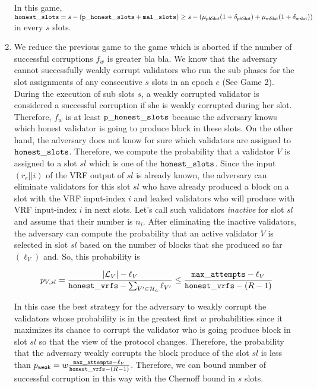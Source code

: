 \begin{enumerate}[label={{Game }}{{\arabic*}}]
	 In this game, $ \mathtt{honest\_slots} = s - (\mathtt{p\_honest\_slots} + \mathtt{mal\_slots}) \geq s - (\mu_{\mathsf{phSlot}}(1+\delta_{\mathsf{phSlot}})+ \mu_{\mathsf{mSlot}}(1+\delta_{\mathsf{mslot}})) $ in every $ s $ slots.
	 \item We reduce the previous game to the game which is aborted if the number of successful corruptions $ f_w $ is greater bla bla. We know that the adversary cannot successfully weakly corrupt validators who run the sub phases for the slot assignments of any consecutive $ s $ slots in an epoch $ e $ (See Game 2). During the execution of sub slots $ s $, a weakly corrupted validator is considered a successful corruption if she is weakly corrupted during her slot. Therefore, $ f_w $ is at least $ \mathtt{p\_honest\_slots} $ because the adversary knows which honest validator is going to produce block in these slots. On the other hand, the adversary does not know for sure which validators are assigned to $ \mathtt{honest\_slots} $. Therefore, we compute the probability that a validator $ V $ is assigned to a slot $ sl $ which is one of the $ \mathtt{honest\_slots} $.
	 Since the input $ (r_e||i) $ of the VRF output of $ sl $ is already known, the adversary can eliminate validators for this slot $ sl $ who have already produced a block on a slot with the VRF input-index $ i $ and leaked validators who will produce with VRF input-index $ i $ in next slots. Let's call such validators \emph{inactive} for slot $ sl $ and assume that their number is $ n_i $. After eliminating the inactive validators, the adversary can compute the probability that an active validator $ V $ is selected in slot $ sl $ based on the number of blocks that she produced so far $ (\ell_V) $ and. So, this probability is
	 
	 
	 \begin{equation}\label{eq:prVs}
	 	p_{V,sl} = \frac{|\mathcal{L}_V|- \ell_V}{\mathtt{honest\_vrfs} - \sum_{V' \in \mathcal{H}_a}\ell_{V'}}\leq \frac{\mathtt{max\_attempts} - \ell_V}{\mathtt{honest\_vrfs} - (R-1)}
	 \end{equation}

	 
	 In this case the best strategy for the adversary to weakly corrupt the validators whose probability is in the greatest first $ w $ probabilities since it maximizes its chance to corrupt the validator who is going produce block in slot $ sl $ so that the view of the protocol changes. Therefore, the probability that the adversary weakly corrupts the block produce of the slot $ sl  $ is less than $p_{\mathsf{weak}} = w \frac{\mathtt{max\_attempts} - \ell_V}{\mathtt{honest\_vrfs} - (R-1)} $. Therefore, we can bound  number of successful corruption in this way with the Chernoff bound in $ s $  slots.
	 

\end{enumerate}
